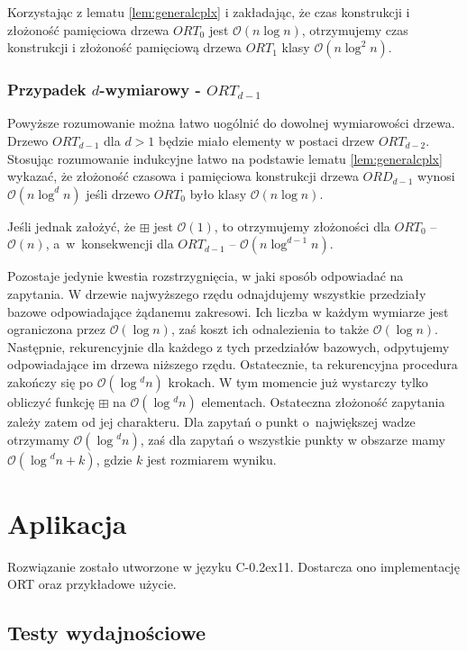 \documentclass[a4paper]{article}
\newcommand*\cpp{C\kern-0.2ex\raisebox{0.4ex}{\scalebox{0.8}{+\kern-0.4ex+}}}
\begin{document}
Korzystając z lematu \ref{lem:generalcplx} i zakładając, że czas konstrukcji i złożoność pamięciowa drzewa $ORT_0$ jest $\mathcal{O}(n \log{}n)$, otrzymujemy czas konstrukcji i złożoność pamięciową drzewa $ORT_1$ klasy $\mathcal{O}(n \log^2{}n)$.

\subsubsection{Przypadek $d$-wymiarowy - $ORT_{d-1}$}

Powyższe rozumowanie można łatwo uogólnić do dowolnej wymiarowości drzewa. Drzewo $ORT_{d-1}$ dla $d > 1$ będzie miało elementy w postaci drzew $ORT_{d-2}$. Stosując rozumowanie indukcyjne łatwo na podstawie lematu \ref{lem:generalcplx} wykazać, że złożoność czasowa i pamięciowa konstrukcji drzewa $ORD_{d-1}$ wynosi $\mathcal{O}(n \log^d{} n)$ jeśli drzewo $ORT_0$ było klasy $\mathcal{O}(n \log{} n)$.

Jeśli jednak założyć, że $\boxplus$ jest $\mathcal{O}(1)$, to otrzymujemy złożoności dla $ORT_0$ -- $\mathcal{O}(n)$, a~w~konsekwencji dla $ORT_{d-1}$ -- $\mathcal{O}(n \log^{d-1}{} n)$.

Pozostaje jedynie kwestia rozstrzygnięcia, w jaki sposób odpowiadać na zapytania. W drzewie najwyższego rzędu odnajdujemy wszystkie przedziały bazowe odpowiadające żądanemu zakresowi. Ich liczba w każdym wymiarze jest ograniczona przez $\mathcal{O}(\log{} n)$, zaś koszt ich odnalezienia to także $\mathcal{O}(\log{} n)$. Następnie, rekurencyjnie dla każdego z tych przedziałów bazowych, odpytujemy odpowiadające im drzewa niższego rzędu. Ostatecznie, ta rekurencyjna procedura zakończy się po $\mathcal{O}(\log{}^d n)$ krokach. W tym momencie już wystarczy tylko obliczyć funkcję $\boxplus$ na $\mathcal{O}(\log{}^d n)$ elementach. Ostateczna złożoność zapytania zależy zatem od jej charakteru. Dla zapytań o punkt o~największej wadze otrzymamy $\mathcal{O}(\log{}^d n)$, zaś dla zapytań o wszystkie punkty w obszarze mamy $\mathcal{O}(\log{}^d n + k)$, gdzie $k$ jest rozmiarem wyniku.

\section{Aplikacja}
Rozwiązanie zostało utworzone w języku \cpp 11. Dostarcza ono implementację ORT oraz przykładowe użycie.
\subsection{Testy wydajnościowe}
\label{sec:testy}
\end{document}
